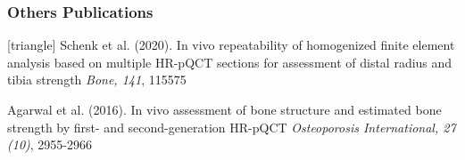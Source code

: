 \documentclass[xcolor=table]{beamer}
\begin{document}
\begin{frame}
	\frametitle{Others Publications}
	\footnotesize{
		\begin{thebibliography}{99}
			[triangle]
			 Schenk et al. (2020).
			\newblock In vivo repeatability of homogenized finite element analysis based on multiple HR-pQCT sections for assessment of distal radius and tibia strength
			\newblock \textit{Bone, 141}, 115575
			
			\vspace{1mm}
			
			 Agarwal et al. (2016).
			\newblock In vivo assessment of bone structure and estimated bone strength by first- and second-generation HR-pQCT
			\newblock \textit{Osteoporosis International, 27 (10)}, 2955-2966
			
		\end{thebibliography}
	}
\end{frame}


\end{document}
